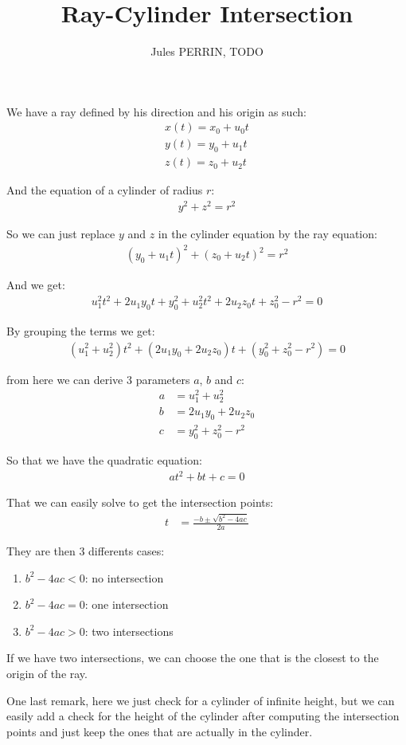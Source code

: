 \documentclass[12pt]{article}
\title{Ray-Cylinder Intersection}
\author{Jules PERRIN, TODO}
\begin{document}
\maketitle

We have a ray defined by his direction and his origin as such:
\begin{align*}
    x(t) = x_0 + u_0 t \\
    y(t) = y_0 + u_1 t \\
    z(t) = z_0 + u_2 t
\end{align*}

And the equation of a cylinder of radius $r$:
\begin{align*}
    y^2 + z^2 = r^2
\end{align*}

So we can just replace $y$ and $z$ in the cylinder equation by the ray equation:
\begin{align*}
    (y_0 + u_1 t)^2 + (z_0 + u_2 t)^2 = r^2
\end{align*}

And we get:
\begin{align*}
    u_1^2 t^2 + 2 u_1 y_0 t + y_0^2 + u_2^2 t^2 + 2 u_2 z_0 t + z_0^2 - r^2 = 0
\end{align*}

By grouping the terms we get:
\begin{align*}
    (u_1^2 + u_2^2)t^2 + (2 u_1 y_0 + 2 u_2 z_0)t + (y_0^2 + z_0^2 - r^2) = 0
\end{align*}

from here we can derive 3 parameters $a$, $b$ and $c$:
\begin{align*}
    a &= u_1^2 + u_2^2 \\
    b &= 2 u_1 y_0 + 2 u_2 z_0 \\
    c &= y_0^2 + z_0^2 - r^2
\end{align*}

So that we have the quadratic equation:
\begin{align*}
    at^2 + bt + c = 0
\end{align*}

That we can easily solve to get the intersection points:
\begin{align*}
    t &= \frac{-b \pm \sqrt{b^2 - 4ac}}{2a}
\end{align*}

They are then 3 differents cases:
\begin{enumerate}
    \item $b^2 - 4ac < 0$: no intersection
    \item $b^2 - 4ac = 0$: one intersection
    \item $b^2 - 4ac > 0$: two intersections
\end{enumerate}

If we have two intersections, we can choose the one that is the closest to the origin of the ray.

One last remark, here we just check for a cylinder of infinite height, but we can easily add a check for the height of the cylinder
after computing the intersection points and just keep the ones that are actually in the cylinder.
\end{document}
